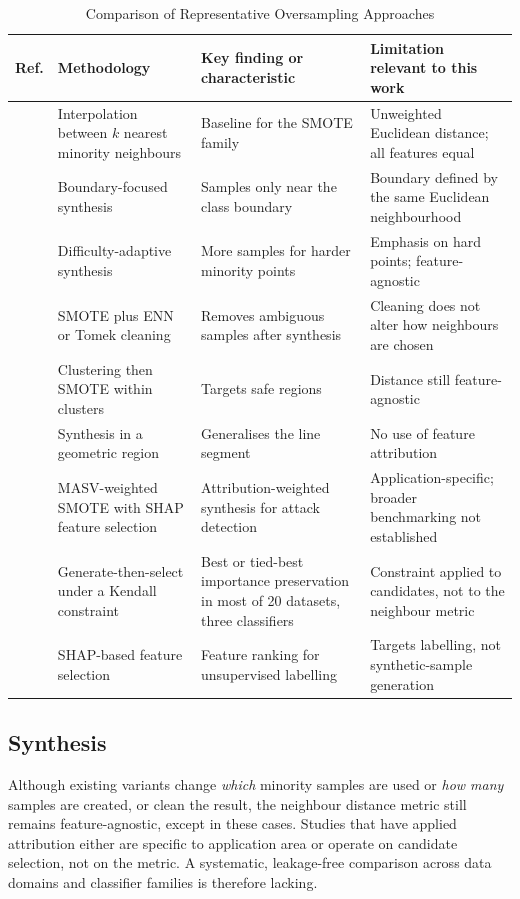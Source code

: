 \documentclass[conference]{IEEEtran}
\begin{document}
\begin{table}[t]
\caption{Comparison of Representative Oversampling Approaches}
\label{tab:lit}
\centering
\small
\begin{tabular}{p{}p{}p{}p{}}
\toprule
\textbf{Ref.} & \textbf{Methodology} & \textbf{Key finding or characteristic} & \textbf{Limitation relevant to this work} \\
\midrule
\cite{b2} & Interpolation between $k$ nearest minority neighbours & Baseline for the SMOTE family & Unweighted Euclidean distance; all features equal \\
\cite{b12} & Boundary-focused synthesis & Samples only near the class boundary & Boundary defined by the same Euclidean neighbourhood \\
\cite{b13} & Difficulty-adaptive synthesis & More samples for harder minority points & Emphasis on hard points; feature-agnostic \\
\cite{b14} & SMOTE plus ENN or Tomek cleaning & Removes ambiguous samples after synthesis & Cleaning does not alter how neighbours are chosen \\
\cite{b15} & Clustering then SMOTE within clusters & Targets safe regions & Distance still feature-agnostic \\
\cite{b16} & Synthesis in a geometric region & Generalises the line segment & No use of feature attribution \\
\cite{b7} & MASV-weighted SMOTE with SHAP feature selection & Attribution-weighted synthesis for attack detection & Application-specific; broader benchmarking not established \\
\cite{b8} & Generate-then-select under a Kendall constraint & Best or tied-best importance preservation in most of 20 datasets, three classifiers & Constraint applied to candidates, not to the neighbour metric \\
\cite{b17} & SHAP-based feature selection & Feature ranking for unsupervised labelling & Targets labelling, not synthetic-sample generation \\
\bottomrule
\end{tabular}
\end{table}

\subsection{Synthesis}
Although existing variants change \emph{which} minority samples are used or \emph{how many} samples are created, or clean the result, the neighbour distance metric still remains feature-agnostic, except in these cases. Studies that have applied attribution either are specific to application area or operate on candidate selection, not on the metric. A systematic, leakage-free comparison across data domains and classifier families is therefore lacking.
\end{document}
